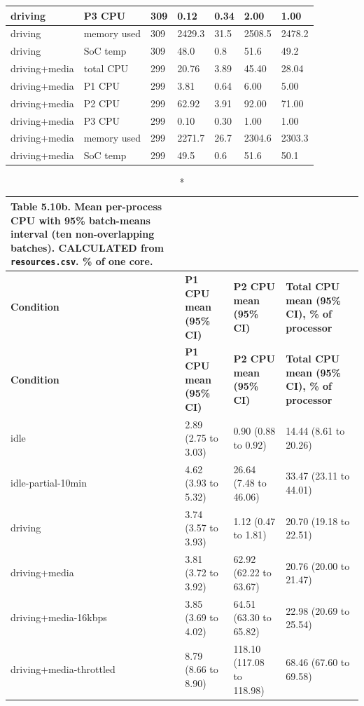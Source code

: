 \begin{center}
\begin{longtable}{|p{3.5cm}|p{2.3cm}|l|l|l|l|l|}
\hline
driving & P3 CPU & 309 & 0.12 & 0.34 & 2.00 & 1.00 \\
\hline
driving & memory used & 309 & 2429.3 & 31.5 & 2508.5 & 2478.2 \\
\hline
driving & SoC temp & 309 & 48.0 & 0.8 & 51.6 & 49.2 \\
\hline
driving+media & total CPU & 299 & 20.76 & 3.89 & 45.40 & 28.04 \\
\hline
driving+media & P1 CPU & 299 & 3.81 & 0.64 & 6.00 & 5.00 \\
\hline
driving+media & P2 CPU & 299 & 62.92 & 3.91 & 92.00 & 71.00 \\
\hline
driving+media & P3 CPU & 299 & 0.10 & 0.30 & 1.00 & 1.00 \\
\hline
driving+media & memory used & 299 & 2271.7 & 26.7 & 2304.6 & 2303.3 \\
\hline
driving+media & SoC temp & 299 & 49.5 & 0.6 & 51.6 & 50.1 \\
\hline
\end{longtable}
\end{center}

\begin{center}
\footnotesize
\begin{longtable}{|p{3.5cm}|p{3cm}|p{3cm}|p{4cm}|}
\caption*{Table 5.10b. Mean per-process CPU with 95\% batch-means interval (ten non-overlapping batches). CALCULATED from \texttt{resources.csv}. \% of one core.}
\addcontentsline{lot}{table}{\protect\numberline{5.10b}Mean per-process CPU with 95\% batch-means interval (ten non-overlapping batches). CALCULATED from \texttt{resources.csv}. \% of one core.}
\\
\hline
\textbf{Condition} & \textbf{P1 CPU mean (95\% CI)} & \textbf{P2 CPU mean (95\% CI)} & \textbf{Total CPU mean (95\% CI), \% of processor} \\
\hline
\endfirsthead
\hline
\textbf{Condition} & \textbf{P1 CPU mean (95\% CI)} & \textbf{P2 CPU mean (95\% CI)} & \textbf{Total CPU mean (95\% CI), \% of processor} \\
\hline
\endhead
idle & 2.89 (2.75 to 3.03) & 0.90 (0.88 to 0.92) & 14.44 (8.61 to 20.26) \\
\hline
idle-partial-10min & 4.62 (3.93 to 5.32) & 26.64 (7.48 to 46.06) & 33.47 (23.11 to 44.01) \\
\hline
driving & 3.74 (3.57 to 3.93) & 1.12 (0.47 to 1.81) & 20.70 (19.18 to 22.51) \\
\hline
driving+media & 3.81 (3.72 to 3.92) & 62.92 (62.22 to 63.67) & 20.76 (20.00 to 21.47) \\
\hline
driving+media-16kbps & 3.85 (3.69 to 4.02) & 64.51 (63.30 to 65.82) & 22.98 (20.69 to 25.54) \\
\hline
driving+media-throttled & 8.79 (8.66 to 8.90) & 118.10 (117.08 to 118.98) & 68.46 (67.60 to 69.58) \\
\hline
\end{longtable}
\end{center}

